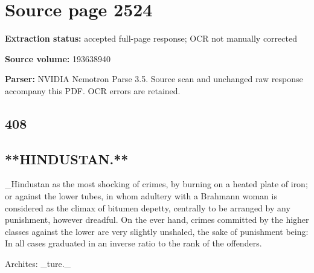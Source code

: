 \clearpage
\section{Source page 2524}
\textbf{Extraction status:} accepted full-page response; OCR not manually corrected\par
\textbf{Source volume:} 193638940\par
\textbf{Parser:} NVIDIA Nemotron Parse 3.5. Source scan and unchanged raw response accompany this PDF. OCR errors are retained.\par\medskip
\subsection*{408}
\subsection*{**HINDUSTAN.**}
\_Hindustan as the most shocking of crimes, by burning on a heated plate of iron; or against the lower tubes, in whom adultery with a Brahmann woman is considered as the climax of bitumen depetty, centrally to be arranged by any punishment, however dreadful. On the ever hand, crimes committed by the higher classes against the lower are very slightly unshaled, the sake of punishment being: In all cases graduated in an inverse ratio to the rank of the offenders.\par\medskip
Archites: \_ture.\_\par\medskip
